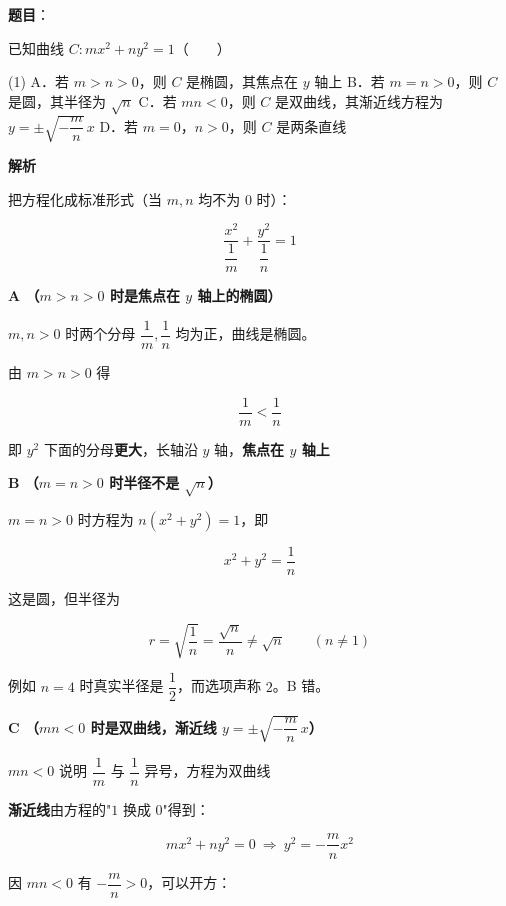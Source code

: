 \begin{answer}

\textbf{题目}：

已知曲线 $C:mx^{2}+ny^{2}=1$\mbox{（　　）}

\begin{gkopts}(1)
\task A．若 $m>n>0$，则 $C$ 是椭圆，其焦点在 $y$ 轴上
\task B．若 $m=n>0$，则 $C$ 是圆，其半径为 $\sqrt n$
\task C．若 $mn<0$，则 $C$ 是双曲线，其渐近线方程为 $y=\pm\sqrt{-\dfrac mn}\,x$
\task D．若 $m=0$，$n>0$，则 $C$ 是两条直线
\end{gkopts}

\textbf{解析}

把方程化成标准形式（当 $m,n$ 均不为 $0$ 时）：

\nopagebreak[4]
\[\frac{x^{2}}{\dfrac1m}+\frac{y^{2}}{\dfrac1n}=1\]

\par\medskip

\textbf{A （$m>n>0$ 时是焦点在 $y$ 轴上的椭圆）}

$m,n>0$ 时两个分母 $\dfrac1m,\dfrac1n$ 均为正，曲线是椭圆。

由 $m>n>0$ 得

\nopagebreak[4]
\[\frac1m<\frac1n\]

即 $y^{2}$ 下面的分母\textbf{更大}，长轴沿 $y$ 轴，\textbf{焦点在 $y$ 轴上} 

\par\medskip

\textbf{B （$m=n>0$ 时半径不是 $\sqrt n$）}

$m=n>0$ 时方程为 $n\left(x^{2}+y^{2}\right)=1$，即

\nopagebreak[4]
\[x^{2}+y^{2}=\frac1n\]

这是圆，但半径为

\nopagebreak[4]
\[r=\sqrt{\frac1n}=\frac{\sqrt n}n\ne\sqrt n\qquad(n\ne1)\]

例如 $n=4$ 时真实半径是 $\dfrac12$，而选项声称 $2$。B 错。

\par\medskip

\textbf{C （$mn<0$ 时是双曲线，渐近线 $y=\pm\sqrt{-\dfrac mn}\,x$）}

$mn<0$ 说明 $\dfrac1m$ 与 $\dfrac1n$ 异号，方程为双曲线 

\textbf{渐近线}由方程的"$1$ 换成 $0$"得到：

\nopagebreak[4]
\[mx^{2}+ny^{2}=0\ \Longrightarrow\ y^{2}=-\frac mn x^{2}\]

因 $mn<0$ 有 $-\dfrac mn>0$，可以开方：


\end{answer}
